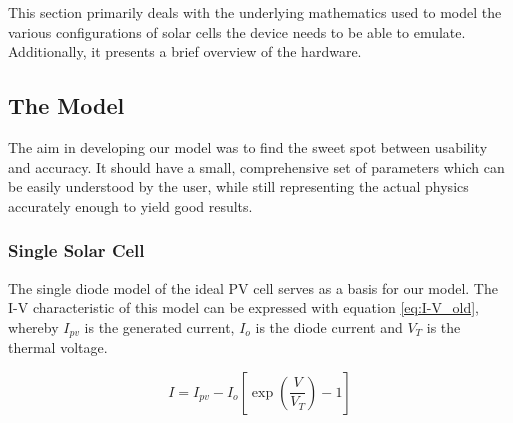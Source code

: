 
This section primarily deals with the underlying mathematics used to model the
various  configurations  of  solar  cells  the device  needs  to  be  able  to
emulate. Additionally, it presents a brief overview of the hardware.

\subsection{The Model}

The aim in developing  our model was to find the  sweet spot between usability
and  accuracy. It  should  have  a  small,  comprehensive  set  of  parameters
which  can be  easily understood  by the  user, while  still representing  the
actual physics  accurately enough to  yield good results.


\subsubsection{Single Solar Cell}

\begin{minipage}{0.6\textwidth}
    The single diode model of the ideal PV cell\cite{ref:villa:pvmodel} serves
    as  a basis  for our  model.   The I-V  characteristic of  this model  can
    be  expressed  with equation  \ref{eq:I-V_old},  whereby  $I_{pv}$ is  the
    generated current,  $I_o$ is the diode  current and $ V_T$  is the thermal
    voltage.
\end{minipage}
\begin{minipage}{0.4\textwidth}
    \begin{equation} \label{eq:I-V_old}
        I = I_{pv} - I_o \left[ \exp \left( \frac{V}{V_T} \right) - 1 \right]
    \end{equation}
\end{minipage}

